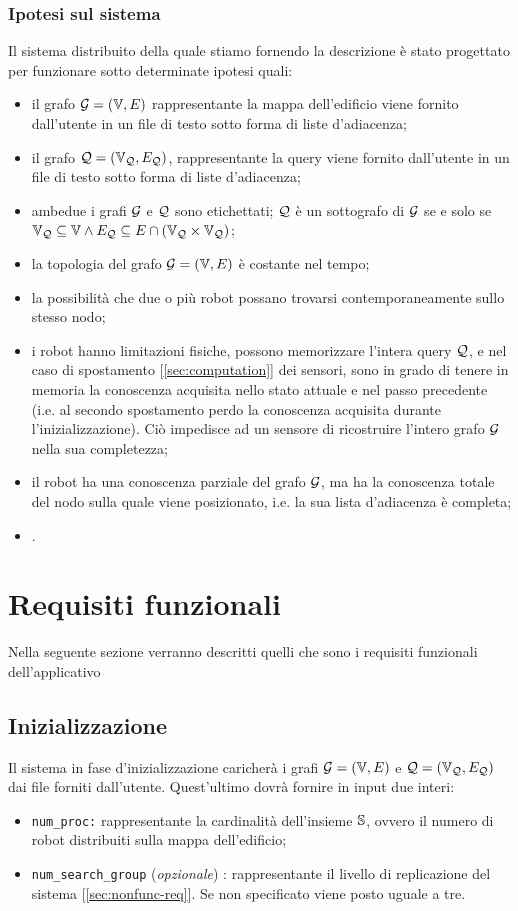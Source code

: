 \documentclass{llncs}
\begin{document}
\subsubsection{Ipotesi sul sistema}
\label{sec:hypotesis}
Il sistema distribuito della quale stiamo fornendo la descrizione è stato progettato per funzionare
sotto determinate ipotesi quali:
\begin{itemize}
	\item il grafo $\mathcal{G} = ( \mathbb{V}, E)$ rappresentante la mappa dell'edificio viene fornito dall'utente in un
	file di testo sotto forma di liste d'adiacenza;
	\item il grafo  $\mathcal{Q} = (\mathbb{V}_{\mathcal{Q}}, E_{\mathcal{Q}})$,  rappresentante la query viene fornito dall'utente in un
	file di testo sotto forma di liste d'adiacenza;
	\item ambedue i grafi $\mathcal{G}$ e $\mathcal{Q}$ sono etichettati; $\mathcal{Q}$ è un sottografo di $\mathcal{G}$ se e solo se
	$\mathbb{V}_{\mathcal{Q}} \subseteq \mathbb{V} \wedge E_{\mathcal{Q}} \subseteq E \cap (\mathbb{V}_{\mathcal{Q}} \times \mathbb{V}_{\mathcal{Q}})$;
	\item la topologia del grafo $\mathcal{G} = ( \mathbb{V}, E)$ è costante nel tempo;
	\item la possibilità che due o più robot possano trovarsi contemporaneamente sullo stesso nodo;
	\item i robot hanno limitazioni fisiche, possono memorizzare l'intera  query $\mathcal{Q}$, e
	nel caso di spostamento [\ref{sec:computation}] dei sensori, sono in grado di tenere
	in memoria la conoscenza acquisita nello stato attuale e nel passo
	precedente (i.e. al secondo spostamento perdo la conoscenza acquisita
	durante l'inizializzazione). Ciò impedisce ad un sensore di ricostruire l'intero grafo $\mathcal{G}$ nella sua completezza;
	\item il robot ha una conoscenza parziale del grafo $\mathcal{G}$, ma ha la conoscenza
	totale del nodo sulla quale viene posizionato, i.e. la sua lista d'adiacenza è completa;
	\item {}.
\end{itemize}
\section{Requisiti funzionali}
Nella seguente sezione verranno descritti quelli che sono i requisiti funzionali dell'applicativo
\subsection{Inizializzazione}
Il sistema in fase d'inizializzazione caricherà i grafi $\mathcal{G} = ( \mathbb{V}, E)$ e $\mathcal{Q} = (\mathbb{V}_{\mathcal{Q}}, E_{\mathcal{Q}})$ dai
file forniti dall'utente. Quest'ultimo dovrà fornire in input due interi:
\begin{itemize}
\item \texttt{num\_proc:} rappresentante la cardinalità dell'insieme $\mathbb{S}$, ovvero il numero di
robot distribuiti sulla mappa dell'edificio;
\item \texttt{num\_search\_group} (\emph{opzionale}) : rappresentante
il livello di replicazione del sistema [\ref*{sec:nonfunc-req}]. Se non specificato viene posto uguale a tre.
\end{itemize}
\end{document}
